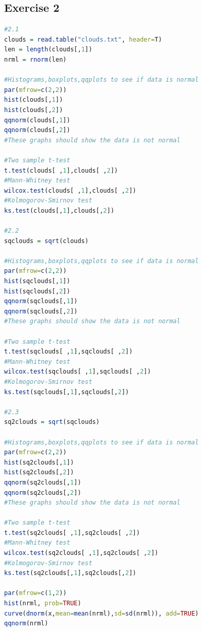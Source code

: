 \documentclass{article}
\begin{document}
    \subsection{Exercise 2}\label{sec:RE2}
      \begin{lstlisting}[language=R]
      #2.1
clouds = read.table("clouds.txt", header=T)
len = length(clouds[,1])
nrml = rnorm(len)

#Histograms,boxplots,qqplots to see if data is normal
par(mfrow=c(2,2))
hist(clouds[,1])
hist(clouds[,2])
qqnorm(clouds[,1])
qqnorm(clouds[,2])
#These graphs should show the data is not normal

#Two sample t-test 
t.test(clouds[ ,1],clouds[ ,2])
#Mann-Whitney test
wilcox.test(clouds[ ,1],clouds[ ,2])
#Kolmogorov-Smirnov test
ks.test(clouds[,1],clouds[,2])

#2.2
sqclouds = sqrt(clouds)

#Histograms,boxplots,qqplots to see if data is normal
par(mfrow=c(2,2))
hist(sqclouds[,1])
hist(sqclouds[,2])
qqnorm(sqclouds[,1])
qqnorm(sqclouds[,2])
#These graphs should show the data is not normal

#Two sample t-test 
t.test(sqclouds[ ,1],sqclouds[ ,2])
#Mann-Whitney test
wilcox.test(sqclouds[ ,1],sqclouds[ ,2])
#Kolmogorov-Smirnov test
ks.test(sqclouds[,1],sqclouds[,2])

#2.3
sq2clouds = sqrt(sqclouds)

#Histograms,boxplots,qqplots to see if data is normal
par(mfrow=c(2,2))
hist(sq2clouds[,1])
hist(sq2clouds[,2])
qqnorm(sq2clouds[,1])
qqnorm(sq2clouds[,2])
#These graphs should show the data is not normal

#Two sample t-test
t.test(sq2clouds[ ,1],sq2clouds[ ,2])
#Mann-Whitney test
wilcox.test(sq2clouds[ ,1],sq2clouds[ ,2])
#Kolmogorov-Smirnov test
ks.test(sq2clouds[,1],sq2clouds[,2])

par(mfrow=c(1,2))
hist(nrml, prob=TRUE)
curve(dnorm(x,mean=mean(nrml),sd=sd(nrml)), add=TRUE)
qqnorm(nrml)
      \end{lstlisting}
\end{document}
